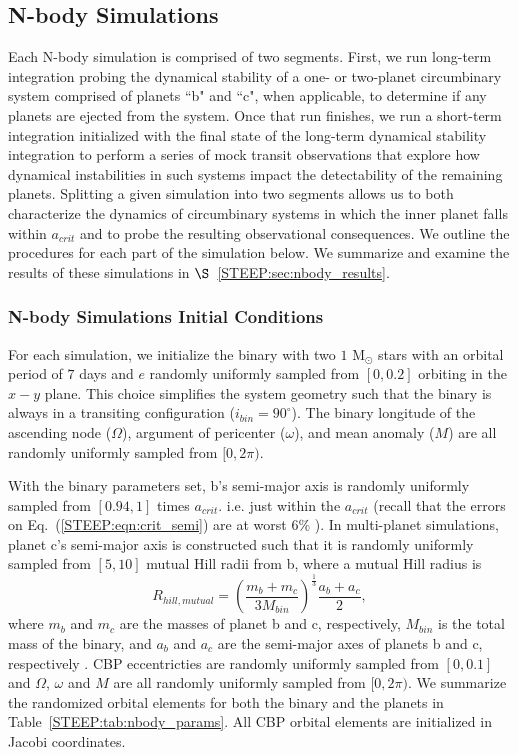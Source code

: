 \subsection{N-body Simulations}

Each N-body simulation is comprised of two segments.  First, we run long-term integration probing the dynamical stability of a one- or two-planet circumbinary system comprised of planets ``b" and ``c", when applicable, to determine if any planets are ejected from the system.  Once that run finishes, we run a short-term integration initialized with the final state of the long-term dynamical stability integration to perform a series of mock transit observations that explore how dynamical instabilities in such systems impact the detectability of the remaining planets.  Splitting a given simulation into two segments allows us to both characterize the dynamics of circumbinary systems in which the inner planet falls within $a_{crit}$ and to probe the resulting observational consequences.  We outline the procedures for each part of the simulation below.  We summarize and examine the results of these simulations in $\S$~\ref{STEEP:sec:nbody_results}.

\subsubsection{N-body Simulations Initial Conditions} \label{STEEP:sec:nbody_initial_conditions}

For each simulation, we initialize the binary with two $1$ M$_{\odot}$ stars with an orbital period of $7$ days and $e$ randomly uniformly sampled from $[0,0.2]$ orbiting in the $x-y$ plane.  This choice simplifies the system geometry such that the binary is always in a transiting configuration ($i_{bin} = 90^{\circ}$).  The binary longitude of the ascending node ($\Omega$), argument of pericenter ($\omega$), and mean anomaly ($M$) are all randomly uniformly sampled from $[0,2\pi)$.

With the binary parameters set, b's semi-major axis is randomly uniformly sampled from $[0.94,1]$ times $a_{crit}$. i.e. just within the $a_{crit}$ (recall that the errors on Eq.~(\ref{STEEP:eqn:crit_semi}) are at worst $6\%$ \citep{Holman1999}).  In multi-planet simulations, planet c's semi-major axis is constructed such that it is randomly uniformly sampled from $[5,10]$ mutual Hill radii from b, where a mutual Hill radius is
\begin{equation} \label{STEEP:eqn:mutual_hill_radius}
R_{hill, mutual} = \left( \frac{m_b + m_c}{3M_{bin}} \right)^{\frac{1}{3}} \frac{a_b + a_c}{2},
\end{equation}
where $m_b$ and $m_c$ are the masses of planet b and c, respectively, $M_{bin}$ is the total mass of the binary, and $a_b$ and $a_c$ are the semi-major axes of planets b and c, respectively \citep{Chambers1996}.  CBP eccentricties are randomly uniformly sampled from $[0,0.1]$ and $\Omega$, $\omega$ and $M$ are all randomly uniformly sampled from $[0,2\pi)$.  We summarize the randomized orbital elements for both the binary and the planets in Table~\ref{STEEP:tab:nbody_params}.  All CBP orbital elements are initialized in Jacobi coordinates.

